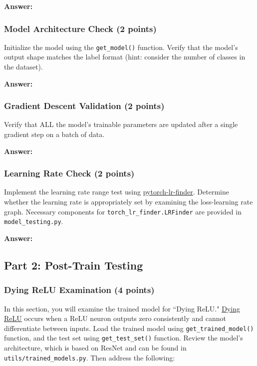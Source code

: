 \documentclass[11pt, oneside]{article}   	%
\begin{document}
\textbf{Answer:} \\

\subsubsection*{Model Architecture Check (2 points)}
Initialize the model using the \texttt{get\_model()} function. Verify that the model’s output shape matches the label format (hint: consider the number of classes in the dataset).

\textbf{Answer:} \\ 

\subsubsection*{Gradient Descent Validation (2 points)}
Verify that ALL the model's trainable parameters are updated after a single gradient step on a batch of data.

\textbf{Answer:} \\


\subsubsection*{Learning Rate Check (2 points)}
 Implement the learning rate range test using \href{https://github.com/davidtvs/pytorch-lr-finder#tweaked-version-from-fastaiauto}{pytorch-lr-finder}. Determine whether the learning rate is appropriately set by examining the loss-learning rate graph. Necessary components for \texttt{torch\_lr\_finder.LRFinder} are provided in \texttt{model\_testing.py}.


\textbf{Answer:} \\

\subsection*{Part 2: Post-Train Testing}

\subsubsection*{Dying ReLU Examination (4 points)}
In this section, you will examine the trained model for ``Dying ReLU." \href{https://datascience.stackexchange.com/questions/5706/what-is-the-dying-relu-problem-in-neural-networks}{Dying ReLU} occurs when a ReLU neuron outputs zero consistently and cannot differentiate between inputs. 
Load the trained model using \texttt{get\_trained\_model()} function, and the test set using \texttt{get\_test\_set()} function. Review the model's architecture, which is based on ResNet and can be found in \texttt{utils/trained\_models.py}. Then address the following:
\end{document}
